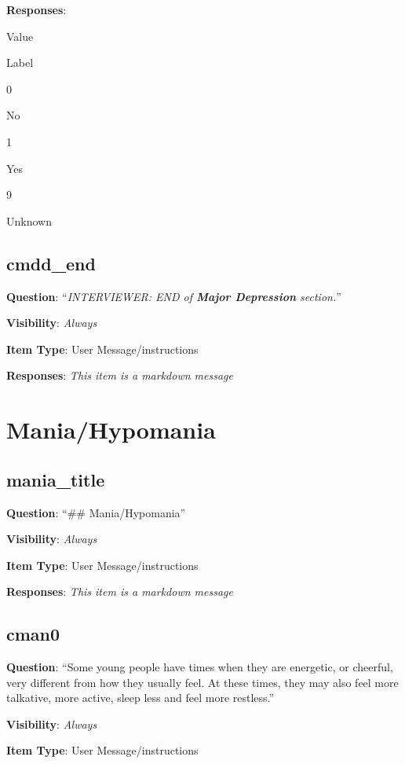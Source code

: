\documentclass[]{book}
\begin{document}
\textbf{Responses}:

Value

Label

0

No

1

Yes

9

Unknown

\hypertarget{cmdd_end}{%
\section{cmdd\_end}\label{cmdd_end}}

\textbf{Question}: ``\emph{INTERVIEWER: END of \textbf{Major Depression} section.}''

\textbf{Visibility}: \emph{Always}

\textbf{Item Type}: User Message/instructions

\textbf{Responses}: \emph{This item is a markdown message}

\hypertarget{mania_section}{%
\chapter{Mania/Hypomania}\label{mania_section}}

\hypertarget{mania_title}{%
\section{mania\_title}\label{mania_title}}

\textbf{Question}: ``\#\# Mania/Hypomania''

\textbf{Visibility}: \emph{Always}

\textbf{Item Type}: User Message/instructions

\textbf{Responses}: \emph{This item is a markdown message}

\hypertarget{cman0}{%
\section{cman0}\label{cman0}}

\textbf{Question}: ``Some young people have times when they are energetic, or cheerful, very different from how they usually feel. At these times, they may also feel more talkative, more active, sleep less and feel more restless.''

\textbf{Visibility}: \emph{Always}

\textbf{Item Type}: User Message/instructions
\end{document}
